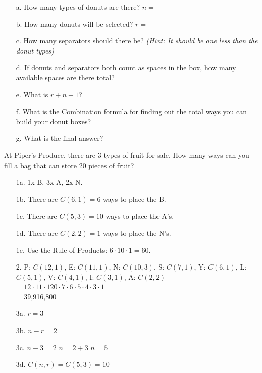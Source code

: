 {\begin{questionNOGRADE}{\thequestion}
        \begin{enumerate}
            \item[a.]   How many types of donuts are there? $n =$
            \item[b.]   How many donuts will be selected? $r = $
            \item[c.]   How many separators should there be?
                        \textit{(Hint: It should be one less than the donut types)}
            \item[d.]   If donuts and separators both count as spaces in the box,
                        how many available spaces are there total?
            \item[e.]   What is $r + n - 1$?
            \item[f.]   What is the Combination formula for finding out the total ways you can build your donut boxes?
            \item[g.]   What is the final answer?
        \end{enumerate}
    \end{questionNOGRADE}

    \hrulefill

    \begin{questionNOGRADE}{\thequestion}
        At Piper's Produce, there are 3 types of fruit for sale.
        How many ways can you fill a bag that can store 20 pieces of fruit?
    \end{questionNOGRADE}
}{
    \begin{itemize}
		\item[1a.]	1x B, 3x A, 2x N.
		\item[1b.]	There are $C(6,1) = 6$ ways to place the B.
		\item[1c.]	There are $C(5,3) = 10$ ways to place the A's.
		\item[1d.]	There are $C(2,2) = 1$ ways to place the N's.
		\item[1e.]	Use the Rule of Products: $6 \cdot 10 \cdot 1 = 60$.
		
		\item[2.]	P: $C(12,1)$, E: $C(11,1)$, N: $C(10,3)$, S: $C(7,1)$, Y: $C(6,1)$, L: $C(5,1)$, V: $C(4,1)$, I: $C(3,1)$, A: $C(2,2)$ \\
					= $12 \cdot 11 \cdot 120 \cdot 7 \cdot 6 \cdot 5 \cdot 4 \cdot 3 \cdot 1$ \\
					= 39,916,800
                    
        \item[3a.]	$r = 3$
        \item[3b.]	$n-r = 2$
        \item[3c.]	$n-3 = 2$ \tab $n = 2 + 3$ \tab $n = 5$
        \item[3d.]	$C(n,r) = C(5,3) = 10$
        

\end{itemize}}
